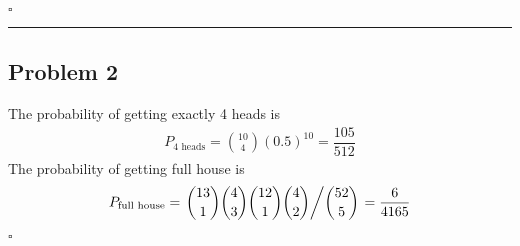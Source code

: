 \documentclass[12pt]{article}
\newcommand*{\QEDB}{\hfill\ensuremath{\square}}
\newcommand{\SBrackets}[1]{\left[#1\right]}
\newcommand{\ParTh}[1]{\left(#1\right)}
\newcommand{\Divide}[2]{\left.#1\middle/#2\right.}
\newcommand{\horrule}[1]{\rule{\linewidth}{#1}}
\begin{document}
\begin{comment}
&=\dfrac{1}{k!}\SBrackets{k!+\sum_{i=1}^{N-\ParTh{k+1}}\dfrac{\ParTh{N-i}!}{\ParTh{\ParTh{N-i}-k}!}}=\dfrac{N!}{\ParTh{k+1}!\ParTh{N-\ParTh{k+1}}!}
\end{align}
\end{enumerate}
Then, we have
\begin{align}
C\ParTh{N,~1}&=C\ParTh{N-1,~1}+C\ParTh{N-1,~0}=C\ParTh{N-1,~1}+1\\
&=C\ParTh{N-2,~1}+C\ParTh{N-2,~0}+1=C\ParTh{N-2,~1}+2\\
&=\cdots=C\ParTh{N-\ParTh{N-1},~1}+\ParTh{N-1}=1+\ParTh{N-1}=N
\end{align}
So we have
\begin{align}
C\ParTh{N,~K}&=C\ParTh{N-1,~K}+C\ParTh{N-1,~K-1}\\
&=C\ParTh{N-1,~K}+C\ParTh{N-2,~K-1}+C\ParTh{N-2,~K-2}\\
&=C\ParTh{N-2,~K}+2C\ParTh{N-2,~K-1}+C\ParTh{N-2,~K-2}\\
&=C\ParTh{N-3,~K}+3C\ParTh{N-3,~K-1}+3C\ParTh{N-3,~K-2}\\
\nonumber
&\hspace{4mm}+C\ParTh{N-3,~K-3}\\
\nonumber
&\hspace{2mm}\vdots\\
&=C\ParTh{N-K,~K}+\binom{K}{1}C\ParTh{N-K,~K-1}+\binom{K}{2}C\ParTh{N-K,~K-2}\\
\nonumber
&\hspace{4mm}+\cdots+\binom{K}{K-1}C\ParTh{N-K,~K-K+1}+\binom{K}{K}C\ParTh{N-K,~K-K}
\end{align}
\end{comment}

\QEDB

\horrule{0.5pt}

\subsection*{Problem 2}

The probability of getting exactly 4 heads is
\begin{align}
P_{\text{4 heads}}=\binom{10}{4}\ParTh{0.5}^{10}=\dfrac{105}{512}
\end{align}
The probability of getting full house is
\begin{align}
P_{\text{full house}}=\Divide{\binom{13}{1}\binom{4}{3}\binom{12}{1}\binom{4}{2}}{\binom{52}{5}}=\dfrac{6}{4165}
\end{align}

\QEDB
\end{document}
